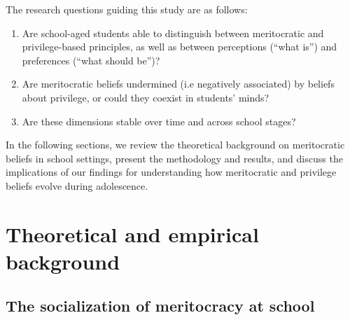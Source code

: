 \documentclass[
  13pt,
]{article}
\begin{document}
The research questions guiding this study are as follows:

\begin{enumerate}
\def\labelenumi{(\arabic{enumi})}
\item
  Are school-aged students able to distinguish between meritocratic and
  privilege-based principles, as well as between perceptions (``what
  is'') and preferences (``what should be'')?
\item
  Are meritocratic beliefs undermined (i.e negatively associated) by
  beliefs about privilege, or could they coexist in students' minds?
\item
  Are these dimensions stable over time and across school stages?
\end{enumerate}

In the following sections, we review the theoretical background on
meritocratic beliefs in school settings, present the methodology and
results, and discuss the implications of our findings for understanding
how meritocratic and privilege beliefs evolve during adolescence.

\section{Theoretical and empirical
background}\label{theoretical-and-empirical-background}

\subsection{The socialization of meritocracy at
school}\label{the-socialization-of-meritocracy-at-school}
\end{document}
